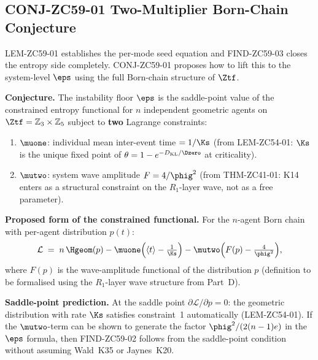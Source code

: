 \documentclass[12pt, a4paper]{article}
\begin{document}
\subsection{CONJ-ZC59-01 \quad Two-Multiplier Born-Chain Conjecture}
\label{sec:conj01}

LEM-ZC59-01 establishes the per-mode seed equation and
FIND-ZC59-03 closes the entropy side completely.  CONJ-ZC59-01
proposes how to lift this to the system-level $\eps$ using the
full Born-chain structure of $\Ztf$.


\begin{derivedbox}[title={CONJ-ZC59-01: Two-Multiplier MaxEnt
  Derivation of $\eps$ (Near-Formal Candidate, $R_0$)}]
\textbf{Conjecture.}
The instability floor $\eps$ is the saddle-point value of the
constrained entropy functional for $n$ independent geometric
agents on $\Ztf = \mathbb{Z}_3 \times \mathbb{Z}_5$ subject to
\textbf{two} Lagrange constraints:

\begin{enumerate}[leftmargin=2em, noitemsep]
\item $\muone$: individual mean inter-event time $= 1/\Ks$
  (from LEM-ZC54-01: $\Ks$ is the unique fixed point of
  $\theta = 1-e^{-D_{\rm KL}/\Dzero}$ at criticality).
\item $\mutwo$: system wave amplitude $F = 4/\phig^2$
  (from THM-ZC41-01: K14 enters as a structural constraint on
  the $R_1$-layer wave, not as a free parameter).
\end{enumerate}

\textbf{Proposed form of the constrained functional.}
For the $n$-agent Born chain with per-agent distribution
$p(t)$:
\begin{equation}\label{eq:L-mind}
  \mathcal{L} \;=\; n\,\Hgeom(p)
    - \muone\Bigl(\langle t\rangle - \tfrac{1}{\Ks}\Bigr)
    - \mutwo\Bigl(F(p) - \tfrac{4}{\phig^2}\Bigr),
\end{equation}
where $F(p)$ is the wave-amplitude functional of the
distribution $p$ (definition to be formalised using the
$R_1$-layer wave structure from Part~D).

\textbf{Saddle-point prediction.}
At the saddle point $\partial\mathcal{L}/\partial p = 0$:
the geometric distribution with rate $\Ks$ satisfies
constraint~1 automatically (LEM-ZC54-01).  If the
$\mutwo$-term can be shown to generate the factor
$\phig^2/(2(n-1)e)$ in the $\eps$ formula, then
FIND-ZC59-02 follows from the saddle-point condition
without assuming Wald~K35 or Jaynes~K20.


\end{derivedbox}
\end{document}
